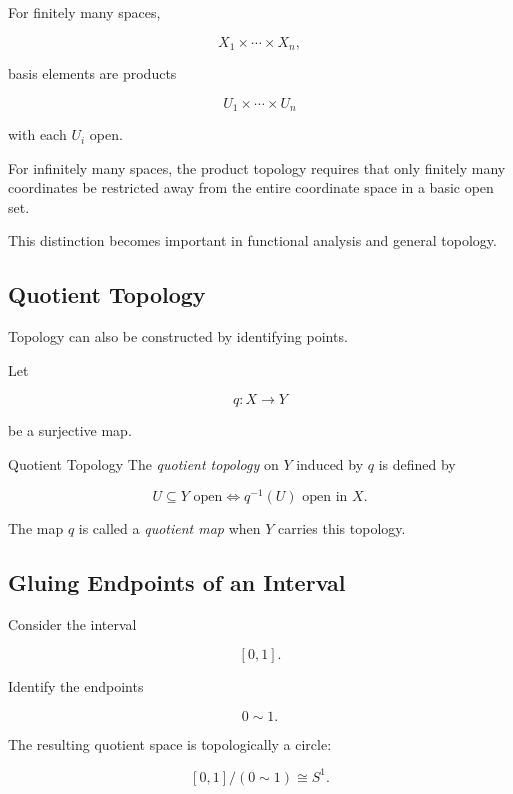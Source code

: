 For finitely many spaces,

\[
X_1\times\cdots\times X_n,
\]

basis elements are products

\[
U_1\times\cdots\times U_n
\]

with each \(U_i\) open.

For infinitely many spaces, the product topology requires that only finitely
many coordinates be restricted away from the entire coordinate space in a
basic open set.

This distinction becomes important in functional analysis and general
topology.

\subsection{Quotient Topology}
\label{subsec:quotient-topology}

Topology can also be constructed by identifying points.

Let

\[
q:X\to Y
\]

be a surjective map.

\begin{definitionbox}{Quotient Topology}
The \emph{quotient topology} on \(Y\) induced by \(q\) is defined by

\[
\boxed{
U\subseteq Y\text{ open}
\iff
q^{-1}(U)\text{ open in }X.
}
\]
\end{definitionbox}

The map \(q\) is called a \emph{quotient map} when \(Y\) carries this
topology.

\subsection{Gluing Endpoints of an Interval}
\label{subsec:interval-to-circle-quotient}

Consider the interval

\[
[0,1].
\]

Identify the endpoints

\[
0\sim1.
\]

The resulting quotient space is topologically a circle:

\[
\boxed{
[0,1]/(0\sim1)
\cong
S^1.
}
\]

